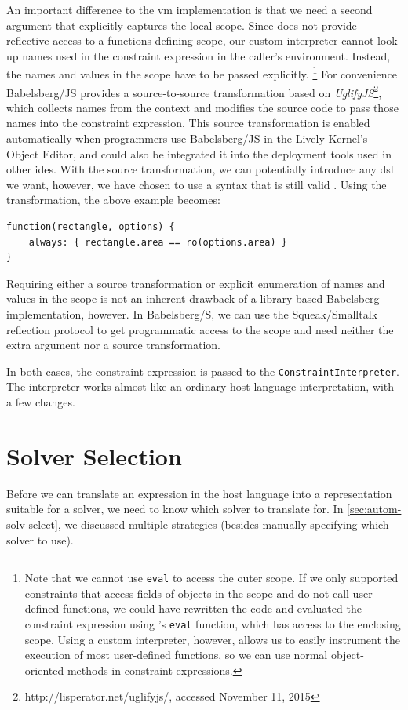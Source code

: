 An important difference to the \ac{vm} implementation is that we need a second
argument that explicitly captures the local scope. Since \javascript does not
provide reflective access to a functions defining scope, our custom interpreter
cannot look up names used in the constraint expression in the caller's
environment. Instead, the names and values in the scope have to be passed
explicitly. \footnote{Note that we cannot use \lstinline{eval} to access the
  outer scope. If we only supported constraints that access fields of objects in
  the scope and do not call user defined functions, we could have rewritten the
  code and evaluated the constraint expression using \javascript's
  \lstinline{eval} function, which has access to the enclosing scope. Using a
  custom interpreter, however, allows us to easily instrument the execution of
  most user-defined functions, so we can use normal object-oriented methods in
  constraint expressions.} For convenience Babelsberg/JS provides a
source-to-source transformation based on
\mbox{\emph{UglifyJS}}\footnote{http://lisperator.net/uglifyjs/, accessed November 11, 2015}, which collects
names from the context and modifies the source code to pass those names into the
constraint expression. This source transformation is enabled automatically when
programmers use Babelsberg/JS in the Lively Kernel's Object Editor, and could
also be integrated it into the deployment tools used in other \javascript
\acp{ide}. With the source transformation, we can potentially introduce any
\ac{dsl} we want, however, we have chosen to use a syntax that is still valid
\javascript. Using the transformation, the above example becomes:
\begin{lstlisting}
function(rectangle, options) {
    always: { rectangle.area == ro(options.area) }
}
\end{lstlisting}
Requiring either a source transformation or explicit enumeration of names and
values in the scope is not an inherent drawback of a library-based Babelsberg
implementation, however. In Babelsberg/S, we can use the Squeak/Smalltalk
reflection protocol to get programmatic access to the scope and need neither the
extra argument nor a source transformation.

In both cases, the constraint expression is passed to the
\lstinline{ConstraintInterpreter}. The interpreter works almost like an ordinary
host language interpretation, with a few changes.

\section{Solver Selection}
\label{sec:solver-selection}
Before we can translate an expression in the host language into a representation
suitable for a solver, we need to know which solver to translate for. In
\autoref{sec:autom-solv-select}, we discussed multiple strategies (besides
manually specifying which solver to use).

